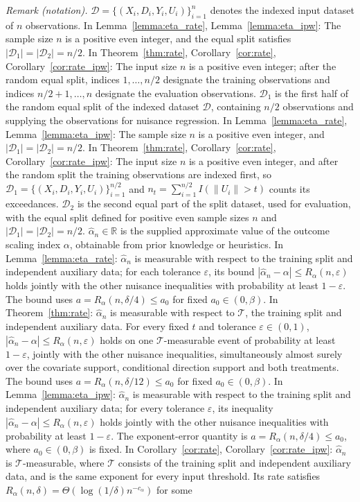 \documentclass[12pt]{article}
\theoremstyle{plain}
\theoremstyle{definition}
\begin{document}
\begin{algorithm}[!tb]
\begin{algorithmic}[1]
\noindent\textit{Remark (notation).} $\mathcal D=\{(X_i,D_i,Y_i,U_i)\}_{i=1}^n$ denotes the indexed input dataset of $n$ observations. In Lemma~\ref{lemma:eta_rate}, Lemma~\ref{lemma:eta_ipw}: The sample size $n$ is a positive even integer, and the equal split satisfies $|\mathcal D_1|=|\mathcal D_2|=n/2$. In Theorem~\ref{thm:rate}, Corollary~\ref{cor:rate}, Corollary~\ref{cor:rate_ipw}: The input size $n$ is a positive even integer; after the random equal split, indices $1,\ldots,n/2$ designate the training observations and indices $n/2+1,\ldots,n$ designate the evaluation observations. $\mathcal D_1$ is the first half of the random equal split of the indexed dataset $\mathcal D$, containing $n/2$ observations and supplying the observations for nuisance regression. In Lemma~\ref{lemma:eta_rate}, Lemma~\ref{lemma:eta_ipw}: The sample size $n$ is a positive even integer, and $|\mathcal D_1|=|\mathcal D_2|=n/2$. In Theorem~\ref{thm:rate}, Corollary~\ref{cor:rate}, Corollary~\ref{cor:rate_ipw}: The input size $n$ is a positive even integer, and after the random split the training observations are indexed first, so $\mathcal D_1=\{(X_i,D_i,Y_i,U_i)\}_{i=1}^{n/2}$ and $n_t=\sum_{i=1}^{n/2}I(\|U_i\|>t)$ counts its exceedances. $\mathcal D_2$ is the second equal part of the split dataset, used for evaluation, with the equal split defined for positive even sample sizes $n$ and $|\mathcal D_1|=|\mathcal D_2|=n/2$. $\hat{\alpha}_n\in\mathbb{R}$ is the supplied approximate value of the outcome scaling index $\alpha$, obtainable from prior knowledge or heuristics. In Lemma~\ref{lemma:eta_rate}: $\hat{\alpha}_n$ is measurable with respect to the training split and independent auxiliary data; for each tolerance $\varepsilon$, its bound $|\hat{\alpha}_n-\alpha|\leq R_\alpha(n,\varepsilon)$ holds jointly with the other nuisance inequalities with probability at least $1-\varepsilon$. The bound uses $a=R_\alpha(n,\delta/4)\leq a_0$ for fixed $a_0\in(0,\beta)$. In Theorem~\ref{thm:rate}: $\hat\alpha_n$ is measurable with respect to $\mathcal T$, the training split and independent auxiliary data. For every fixed $t$ and tolerance $\varepsilon\in(0,1)$, $|\hat\alpha_n-\alpha|\leq R_\alpha(n,\varepsilon)$ holds on one $\mathcal T$-measurable event of probability at least $1-\varepsilon$, jointly with the other nuisance inequalities, simultaneously almost surely over the covariate support, conditional direction support and both treatments. The bound uses $a=R_\alpha(n,\delta/12)\leq a_0$ for fixed $a_0\in(0,\beta)$. In Lemma~\ref{lemma:eta_ipw}: $\hat{\alpha}_n$ is measurable with respect to the training split and independent auxiliary data; for every tolerance $\varepsilon$, its inequality $|\hat{\alpha}_n-\alpha|\leq R_\alpha(n,\varepsilon)$ holds jointly with the other nuisance inequalities with probability at least $1-\varepsilon$. The exponent-error quantity is $a=R_\alpha(n,\delta/4)\leq a_0$, where $a_0\in(0,\beta)$ is fixed. In Corollary~\ref{cor:rate}, Corollary~\ref{cor:rate_ipw}: $\hat\alpha_n$ is $\mathcal T$-measurable, where $\mathcal T$ consists of the training split and independent auxiliary data, and is the same exponent for every input threshold. Its rate satisfies $R_\alpha(n,\delta)=\Theta(\log(1/\delta)n^{-c_\alpha})$ for some 
\end{algorithmic}
\end{algorithm}
\end{document}
